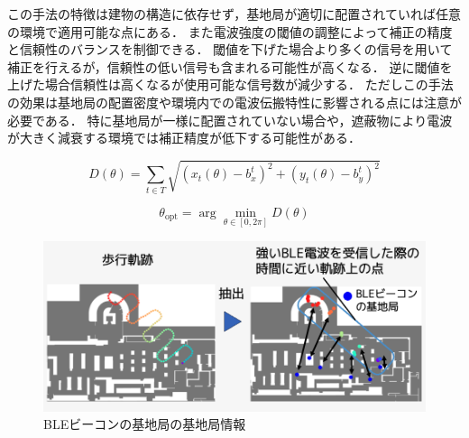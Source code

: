 この手法の特徴は建物の構造に依存せず，基地局が適切に配置されていれば任意の環境で適用可能な点にある．
また電波強度の閾値の調整によって補正の精度と信頼性のバランスを制御できる．
閾値を下げた場合より多くの信号を用いて補正を行えるが，信頼性の低い信号も含まれる可能性が高くなる．
逆に閾値を上げた場合信頼性は高くなるが使用可能な信号数が減少する．
ただしこの手法の効果は基地局の配置密度や環境内での電波伝搬特性に影響される点には注意が必要である．
特に基地局が一様に配置されていない場合や，遮蔽物により電波が大きく減衰する環境では補正精度が低下する可能性がある．

\begin{equation}
\label{eq:distance_sum}
D(\theta) = \sum_{t\in T} \sqrt{(x_t(\theta) - b^t_x)^2 + (y_t(\theta) - b^t_y)^2}
\end{equation}

\begin{equation}
\label{eq:opt}
\theta_{\mathrm{opt}} = \arg\min_{\theta \in [0, 2\pi]} D(\theta)
\end{equation}

\begin{figure}[H]
	\centering
	\includegraphics[width=\linewidth]{../image/ble-merge.jpg}
	\caption{BLEビーコンの基地局の基地局情報}    \label{fig:ble-merge}
\end{figure}
